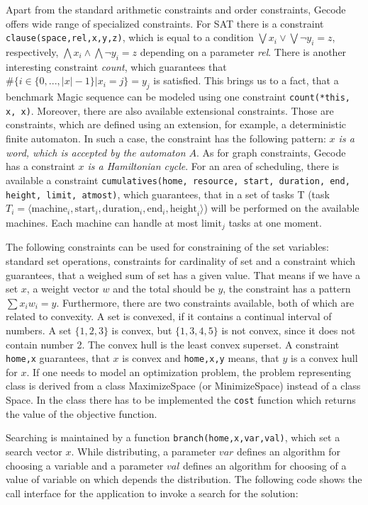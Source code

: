 Apart from the standard arithmetic constraints and order constraints, Gecode offers
wide range of specialized constraints. For SAT there is a constraint \texttt{clause(space,rel,x,y,z)},
which is equal to a condition $\bigvee {x_i} \vee \bigvee{\neg y_i} = z$, respectively, $\bigwedge {x_i} \wedge \bigwedge{\neg y_i} = z$
depending on a parameter {\em rel}. There is another interesting constraint {\em count}, which 
guarantees that $\#\{i \in \{0, ..., |x|-1\}|x_i = j\} = y_j$ is satisfied. This brings us to a fact,
that a benchmark Magic sequence can be modeled using one constraint \texttt{count(*this, x, x)}.
Moreover, there are also available extensional constraints. Those are constraints, which are 
defined using an extension, for example, a deterministic finite automaton. In such a case, the constraint
has the following pattern:  {\em $x$ is a word, which is accepted by the automaton $A$}. As for graph constraints, 
Gecode has a constraint {\em $x$ is a Hamiltonian cycle}. For an area of scheduling, there is available
a constraint \texttt{cumulatives(home, resource, start, duration, end, height, limit, atmost)}, which
guarantees, that in a set of tasks T (task $T_i = \langle \mathrm{machine}_i, \mathrm{start}_i,
\mathrm{duration}_i, \mathrm{end}_i, \mathrm{height}_i \rangle$) will be performed on 
the available machines. Each machine can handle at most $\mathrm{limit}_j$ tasks at
one moment.

The following constraints can be used for constraining of the set variables: standard 
set operations, constraints for cardinality of set and a constraint
which guarantees, that a weighed sum of set has a given value. That means if we have a set $x$, 
a weight vector $w$ and the total should be $y$, the constraint has a pattern $\sum{x_i w_i} = y$. 
Furthermore, there are two constraints available, both of which are related to convexity. A set is convexed, 
if it contains a continual interval of numbers. A set $\{1,2,3\}$ is convex, but $\{1,3,4,5\}$ is not 
convex, since it does not contain number 2. The convex hull is the least convex superset. A constraint
\texttt{home,x} guarantees, that $x$ is convex and \texttt{home,x,y} means, that $y$ is a convex hull for $x$.
If one needs to model an optimization problem, the problem representing class is derived from a class MaximizeSpace (or MinimizeSpace)
instead of a class Space. In the class there has to be implemented the \texttt{cost} function which returns
the value of the objective function. 

Searching is maintained by a function \texttt{branch(home,x,var,val)}, which set a search vector $x$. While distributing,
a parameter $var$ defines an algorithm for choosing a variable and a parameter $val$ defines an algorithm
for choosing of a value of variable on which depends the distribution. The following code shows the call interface
for the application to invoke a search for the solution: 

